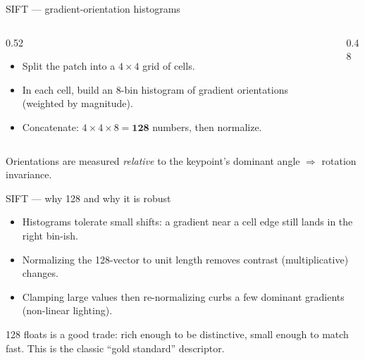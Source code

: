 \documentclass[10pt,aspectratio=169]{beamer}
\begin{document}
\begin{frame}{SIFT — gradient-orientation histograms}
  \begin{columns}[T]
    \begin{column}{0.52\textwidth}
      \begin{itemize}
        \item Split the patch into a $4\times4$ grid of cells.
        \item In each cell, build an 8-bin histogram of gradient orientations (weighted by magnitude).
        \item Concatenate: $4\times4\times8 = \mathbf{128}$ numbers, then normalize.
      \end{itemize}
    \end{column}
    \begin{column}{0.48\textwidth}
      \begin{center}
      \end{center}
    \end{column}
  \end{columns}
  \begin{mathbox}
    Orientations are measured \emph{relative} to the keypoint's dominant angle $\Rightarrow$ rotation invariance.
  \end{mathbox}
\end{frame}

\begin{frame}{SIFT — why 128 and why it is robust}
  \begin{itemize}
    \item Histograms tolerate small shifts: a gradient near a cell edge still lands in the right bin-ish.
    \item Normalizing the 128-vector to unit length removes contrast (multiplicative) changes.
    \item Clamping large values then re-normalizing curbs a few dominant gradients (non-linear lighting).
  \end{itemize}
  \begin{goodbox}
    128 floats is a good trade: rich enough to be distinctive, small enough to match fast. This is the
    classic ``gold standard'' descriptor.
  \end{goodbox}
\end{frame}
\end{document}
